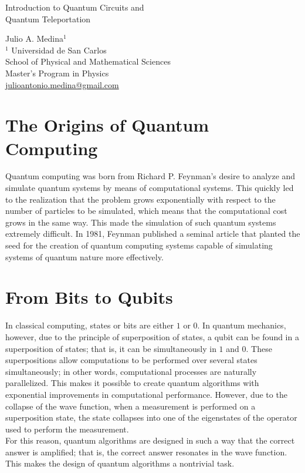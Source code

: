 \documentclass[a4paper]{article}
\begin{document}

\Large
 \begin{center}
Introduction to Quantum Circuits and\\
Quantum Teleportation

\hspace{10pt}

\large
Julio A. Medina$^1$ \\
\hspace{10pt}
\small
$^1$ Universidad de San Carlos\\
School of Physical and Mathematical Sciences\\
Master's Program in Physics\\
\href{mailto:julioantonio.medina@gmail.com}{julioantonio.medina@gmail.com}\\

\end{center}

\hspace{10pt}

\normalsize
\section{The Origins of Quantum Computing}
Quantum computing was born from Richard P. Feynman's desire to analyze and simulate quantum systems by means of computational systems. This quickly led to the realization that the problem grows exponentially with respect to the number of particles to be simulated, which means that the computational cost grows in the same way. This made the simulation of such quantum systems extremely difficult. In 1981, Feynman\cite{Feynman} published a seminal article that planted the seed for the creation of quantum computing systems capable of simulating systems of quantum nature more effectively. \\

\section{From Bits to Qubits}
In classical computing, states or bits are either $1$ or $0$. In quantum mechanics, however, due to the principle of superposition of states, a qubit can be found in a superposition of states; that is, it can be simultaneously in $1$ and $0$. These superpositions allow computations to be performed over several states simultaneously; in other words, computational processes are naturally parallelized. This makes it possible to create quantum algorithms with exponential improvements in computational performance. However, due to the collapse of the wave function, when a measurement is performed on a superposition state, the state collapses into one of the eigenstates of the operator used to perform the measurement. \\
For this reason, quantum algorithms are designed in such a way that the correct answer is amplified; that is, the correct answer resonates in the wave function. This makes the design of quantum algorithms a nontrivial task.
\end{document}

